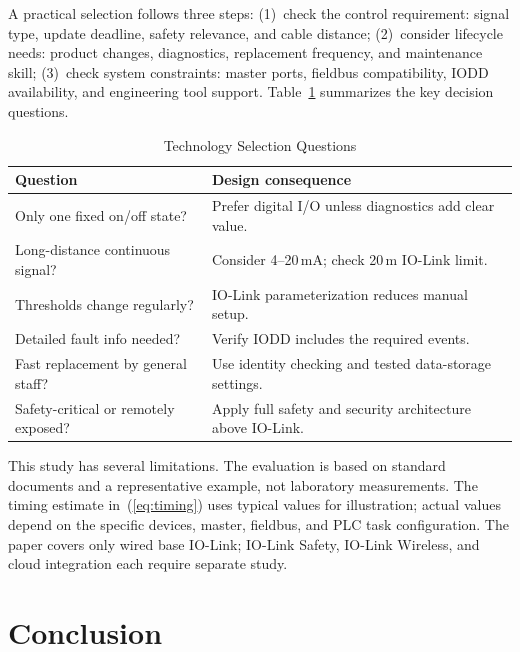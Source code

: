 \documentclass[conference]{IEEEtran}
\begin{document}
A practical selection follows three steps: (1)~check the control
requirement: signal type, update deadline, safety relevance, and cable
distance; (2)~consider lifecycle needs: product changes, diagnostics,
replacement frequency, and maintenance skill; (3)~check system
constraints: master ports, fieldbus compatibility, IODD availability,
and engineering tool support. Table~\ref{tab:select} summarizes the key
decision questions.

\begin{table}[!t]
\caption{Technology Selection Questions}
\label{tab:select}
\renewcommand{\arraystretch}{1.2}
\begin{tabularx}{\columnwidth}{@{}p{3.45cm} p{3.7cm}@{}}
\toprule
\textbf{Question} & \textbf{Design consequence} \\
\midrule
Only one fixed on/off state? &
  Prefer digital I/O unless diagnostics add clear value. \\[2pt]
Long-distance continuous signal? &
  Consider 4--20\,mA; check 20\,m IO-Link limit. \\[2pt]
Thresholds change regularly? &
  IO-Link parameterization reduces manual setup. \\[2pt]
Detailed fault info needed? &
  Verify IODD includes the required events. \\[2pt]
Fast replacement by general staff? &
  Use identity checking and tested data-storage settings. \\[2pt]
Safety-critical or remotely exposed? &
  Apply full safety and security architecture above IO-Link. \\
\bottomrule
\end{tabularx}
\end{table}

This study has several limitations. The evaluation is based on standard
documents and a representative example, not laboratory measurements.
The timing estimate in~(\ref{eq:timing}) uses typical values for
illustration; actual values depend on the specific devices, master,
fieldbus, and PLC task configuration. The paper covers only wired base
IO-Link; IO-Link Safety, IO-Link Wireless, and cloud integration each
require separate study.

\section{Conclusion}
\label{sec:conclusion}
\end{document}
